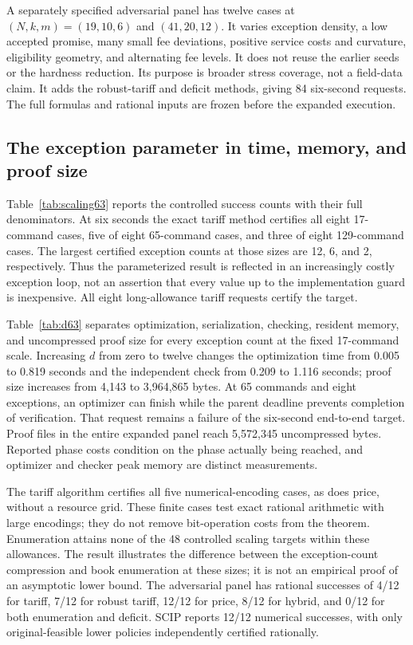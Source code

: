 \documentclass[11pt,letterpaper]{article}
\theoremstyle{definition}\newtheorem{remark}[theorem]{Remark}
\begin{document}
A separately specified adversarial panel has twelve cases at $(N,k,m)=(19,10,6)$ and $(41,20,12)$. It varies exception density, a low accepted promise, many small fee deviations, positive service costs and curvature, eligibility geometry, and alternating fee levels. It does not reuse the earlier seeds or the hardness reduction. Its purpose is broader stress coverage, not a field-data claim. It adds the robust-tariff and deficit methods, giving 84 six-second requests. The full formulas and rational inputs are frozen before the expanded execution.

\subsection{The exception parameter in time, memory, and proof size}
Table~\ref{tab:scaling63} reports the controlled success counts with their full denominators. At six seconds the exact tariff method certifies all eight 17-command cases, five of eight 65-command cases, and three of eight 129-command cases. The largest certified exception counts at those sizes are 12, 6, and 2, respectively. Thus the parameterized result is reflected in an increasingly costly exception loop, not an assertion that every value up to the implementation guard is inexpensive. All eight long-allowance tariff requests certify the target.

Table~\ref{tab:d63} separates optimization, serialization, checking, resident memory, and uncompressed proof size for every exception count at the fixed 17-command scale. Increasing $d$ from zero to twelve changes the optimization time from 0.005 to 0.819 seconds and the independent check from 0.209 to 1.116 seconds; proof size increases from 4,143 to 3,964,865 bytes. At 65 commands and eight exceptions, an optimizer can finish while the parent deadline prevents completion of verification. That request remains a failure of the six-second end-to-end target. Proof files in the entire expanded panel reach 5,572,345 uncompressed bytes. Reported phase costs condition on the phase actually being reached, and optimizer and checker peak memory are distinct measurements.

The tariff algorithm certifies all five numerical-encoding cases, as does price, without a resource grid. These finite cases test exact rational arithmetic with large encodings; they do not remove bit-operation costs from the theorem. Enumeration attains none of the 48 controlled scaling targets within these allowances. The result illustrates the difference between the exception-count compression and book enumeration at these sizes; it is not an empirical proof of an asymptotic lower bound. The adversarial panel has rational successes of 4/12 for tariff, 7/12 for robust tariff, 12/12 for price, 8/12 for hybrid, and 0/12 for both enumeration and deficit. SCIP reports 12/12 numerical successes, with only original-feasible lower policies independently certified rationally.
\end{document}
